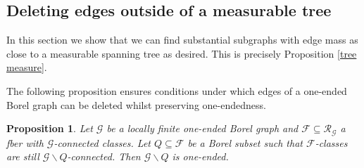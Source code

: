 \documentclass[letterpaper,11pt,reqno]{amsart}
\theoremstyle{bfnote}
\newtheorem{prop}[theorem]{Proposition}
\theoremstyle{definition}
\newcommand{\0}{\varnothing}
\renewcommand{\leq}{\leqslant}
\numberwithin{equation}{section}
\begin{document}

\subsection{Deleting edges outside of a measurable tree}\label{sec:out of tree}

In this section we show that we can find substantial subgraphs with edge mass as close to a measurable spanning tree as desired. This is precisely Proposition \ref{tree measure}.

The following proposition ensures conditions under which edges of a one-ended Borel graph can be deleted whilst preserving one-endedness.

\begin{prop}\label{prop:stays.one.ended}
    Let $\mathcal{G}$ be a locally finite one-ended Borel graph and $\mathcal{F} \subseteq \mathcal{R}_{\mathcal{G}}$ a fber with $\mathcal{G}$-connected classes. Let $Q \subseteq \mathcal{F}$ be a Borel subset such that $\mathcal{F}$-classes are still $\mathcal{G} \backslash Q$-connected. Then $\mathcal{G} \backslash Q$ is one-ended. 
\end{prop}
\end{document}
